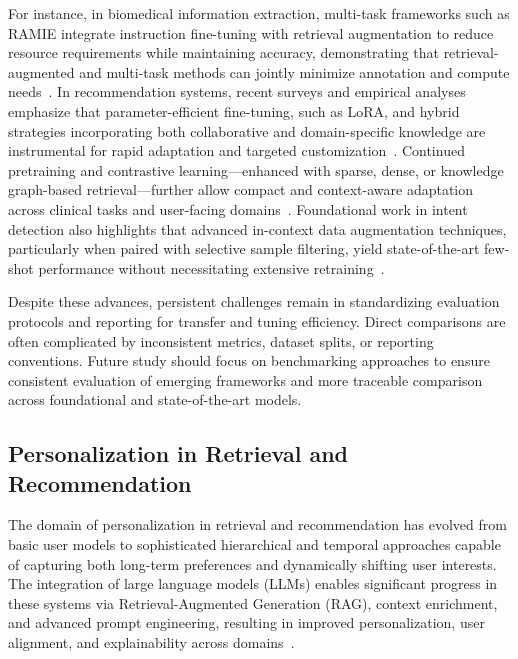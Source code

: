 \documentclass[sigconf]{acmart}
\begin{document}
For instance, in biomedical information extraction, multi-task frameworks such as RAMIE integrate instruction fine-tuning with retrieval augmentation to reduce resource requirements while maintaining accuracy, demonstrating that retrieval-augmented and multi-task methods can jointly minimize annotation and compute needs~\cite{ref32}. In recommendation systems, recent surveys and empirical analyses emphasize that parameter-efficient fine-tuning, such as LoRA, and hybrid strategies incorporating both collaborative and domain-specific knowledge are instrumental for rapid adaptation and targeted customization~\cite{ref32, ref33}. Continued pretraining and contrastive learning—enhanced with sparse, dense, or knowledge graph-based retrieval—further allow compact and context-aware adaptation across clinical tasks and user-facing domains~\cite{ref33, ref55}. Foundational work in intent detection also highlights that advanced in-context data augmentation techniques, particularly when paired with selective sample filtering, yield state-of-the-art few-shot performance without necessitating extensive retraining~\cite{ref61}.

Despite these advances, persistent challenges remain in standardizing evaluation protocols and reporting for transfer and tuning efficiency. Direct comparisons are often complicated by inconsistent metrics, dataset splits, or reporting conventions. Future study should focus on benchmarking approaches to ensure consistent evaluation of emerging frameworks and more traceable comparison across foundational and state-of-the-art models.

\subsection{Personalization in Retrieval and Recommendation}

The domain of personalization in retrieval and recommendation has evolved from basic user models to sophisticated hierarchical and temporal approaches capable of capturing both long-term preferences and dynamically shifting user interests. The integration of large language models (LLMs) enables significant progress in these systems via Retrieval-Augmented Generation (RAG), context enrichment, and advanced prompt engineering, resulting in improved personalization, user alignment, and explainability across domains~\cite{ref3,ref4,ref5,ref11,ref13,ref19,ref21,ref23,ref24,ref30,ref32,ref33,ref34,ref36,ref39,ref52,ref55,ref61}.
\end{document}
